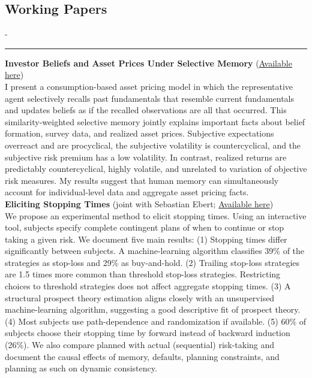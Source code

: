 \documentclass{res}
\newcommand{\sectionline}{	\vspace{-8pt}
	{\parindent-\sectionwidth \rule{\resumewidth}{0.4pt}} }
\begin{document}
\begin{resume}
\section{Working Papers} 	
	\sectionline
    \textbf{Investor Beliefs and Asset Prices Under Selective Memory} (\href{http://maxvoigt.github.io/files/Voigt_JMP_BeliefsAssetPrices.pdf}{Available here}) \\
	I present a consumption-based asset pricing model in which the representative agent selectively recalls past fundamentals that resemble current fundamentals and updates beliefs as if the recalled observations are all that occurred. This similarity-weighted selective memory jointly explains important facts about belief formation, survey data, and realized asset prices. Subjective expectations overreact and are procyclical, the subjective volatility is countercyclical, and the subjective risk premium has a low volatility. In contrast, realized returns are predictably countercyclical, highly volatile, and unrelated to variation of objective risk measures. My results suggest that human memory can simultaneously account for individual-level data and aggregate asset pricing facts.
	\medskip
	\\
    \textbf{Eliciting Stopping Times} (joint with Sebastian Ebert; \href{https://papers.ssrn.com/sol3/papers.cfm?abstract_id=4526931}{Available here})\\
    We propose an experimental method to elicit stopping times. Using an interactive tool, subjects specify complete contingent plans of when to continue or stop taking a given risk. We document five main results: (1) Stopping times differ significantly between subjects. A machine-learning algorithm classifies 39\% of the strategies as stop-loss and 29\% as buy-and-hold. (2) Trailing stop-loss strategies are 1.5 times more common than threshold stop-loss strategies. Restricting choices to threshold strategies does not affect aggregate stopping times. (3) A structural prospect theory estimation aligns closely with an unsupervised machine-learning algorithm, suggesting a good descriptive fit of prospect theory. (4) Most subjects use path-dependence and randomization if available. (5) 60\% of subjects choose their stopping time by forward instead of backward induction (26\%). We also compare planned with actual (sequential) risk-taking and document the causal effects of memory, defaults, planning constraints, and planning as such on dynamic consistency.
	\medskip
    \\ \\

\end{resume}
\end{document}
